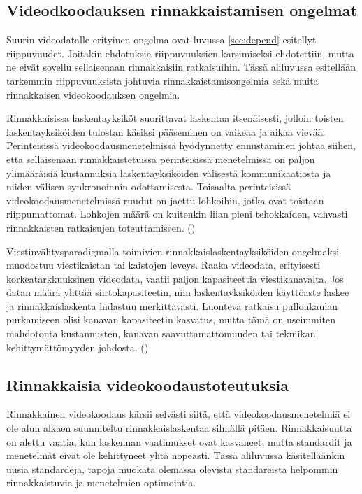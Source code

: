 \subsection{Videodkoodauksen rinnakkaistamisen ongelmat}
\label{sec:problems}

Suurin videodatalle erityinen ongelma ovat luvussa \ref{sec:depend} esitellyt riippuvuudet.
Joitakin ehdotuksia riippuvuuksien
karsimiseksi ehdotettiin, mutta ne eivät sovellu sellaisenaan rinnakkaisiin
ratkaisuihin. Tässä aliluvussa esitellään tarkemmin riippuvuuksista johtuvia 
rinnakkaistamisongelmia sekä muita rinnakkaisen videokoodauksen ongelmia.

Rinnakkaisissa laskentayksiköt suorittavat laskentaa itsenäisesti, jolloin
toisten laskentayksiköiden tulostan käsiksi pääseminen on vaikeaa ja
aikaa vievää. Perinteisissä videokoodausmenetelmissä hyödynnetty ennustaminen
johtaa siihen, että sellaisenaan rinnakkaistetuissa perinteisissä menetelmissä
on paljon ylimääräisiä kustannuksia laskentayksiköiden välisestä
kommunikaatiosta ja niiden välisen synkronoinnin odottamisesta. Toisaalta
perinteisissä videokoodausmenetelmissä ruudut on jaettu lohkoihin, jotka ovat
toistaan riippumattomat. Lohkojen määrä on kuitenkin liian pieni tehokkaiden,
vahvasti rinnakkaisten ratkaisujen toteuttamiseen. (\citealt{pieters})

Viestinvälitysparadigmalla toimivien rinnakkaislaskentayksiköiden ongelmaksi
muodostuu viestikaistan tai kaistojen leveys. Raaka videodata, erityisesti
korkeatarkkuuksinen videodata, vaatii paljon kapasiteettia viestikanavalta. Jos
datan määrä ylittää siirtokapasiteetin, niin laskentayksiköiden käyttöaste
laskee ja rinnakkaislaskenta hidastuu merkittävästi. Luonteva ratkaisu
pullonkaulan purkamiseen olisi kanavan kapasiteetin kasvatus, mutta tämä on
useimmiten mahdotonta kustannusten, kanavan saavuttamattomuuden tai tekniikan
kehittymättömyyden johdosta. (\citealt{li})

\subsection{Rinnakkaisia videokoodaustoteutuksia}

Rinnakkainen videokoodaus kärsii selvästi siitä, että
videokoodausmenetelmiä ei ole alun alkaen suunniteltu rinnakkaislaskentaa
silmällä pitäen. Rinnakkaisuutta on alettu vaatia, kun laskennan vaatimukset
ovat kasvaneet, mutta standardit ja menetelmät eivät ole kehittyneet
yhtä nopeasti. Tässä aliluvussa käsitelläänkin uusia standardeja, tapoja
muokata olemassa olevista standareista helpommin rinnakkaistuvia ja menetelmien
optimointia.

